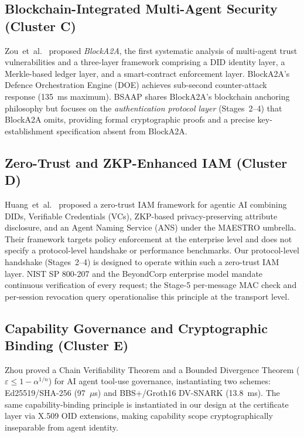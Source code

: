 \documentclass[review,5p,twocolumn,times]{elsarticle}
\begin{document}
\subsection{Blockchain-Integrated Multi-Agent Security (Cluster C)}

Zou~et~al.\ \cite{blocka2a2025} proposed \emph{BlockA2A}, the first
systematic analysis of multi-agent trust vulnerabilities and a three-layer
framework comprising a DID identity layer, a Merkle-based ledger layer, and
a smart-contract enforcement layer. BlockA2A's Defence Orchestration Engine
(DOE) achieves sub-second counter-attack response (135~ms maximum). BSAAP
shares BlockA2A's blockchain anchoring philosophy but focuses on the
\emph{authentication protocol layer} (Stages~2--4) that BlockA2A omits,
providing formal cryptographic proofs and a precise key-establishment
specification absent from BlockA2A.

\subsection{Zero-Trust and ZKP-Enhanced IAM (Cluster D)}

Huang~et~al.\ \cite{zerotrust2025} proposed a zero-trust IAM framework for
agentic AI combining DIDs, Verifiable Credentials (VCs), ZKP-based
privacy-preserving attribute disclosure, and an Agent Naming Service (ANS)
under the MAESTRO umbrella. Their framework targets policy enforcement
at the enterprise level and does not specify a protocol-level handshake or
performance benchmarks. Our protocol-level handshake (Stages~2--4) is
designed to operate within such a zero-trust IAM layer.
NIST SP 800-207 \cite{nist2020zta}
and the BeyondCorp enterprise model \cite{ward2014beyondcorp}
mandate continuous verification of every request; the Stage-5 per-message
MAC check and per-session revocation query operationalise this principle
at the transport level.

\subsection{Capability Governance and Cryptographic Binding (Cluster E)}

Zhou \cite{govdyn2026} proved a Chain Verifiability Theorem and a Bounded
Divergence Theorem ($\varepsilon \leq 1{-}\alpha^{1/n}$) for AI agent
tool-use governance, instantiating two schemes: Ed25519/SHA-256 (97~$\mu$s)
and BBS+/Groth16 DV-SNARK (13.8~ms). The same capability-binding
principle is instantiated in our design at the certificate layer via X.509
OID extensions, making capability scope cryptographically inseparable from
agent identity.
\end{document}
